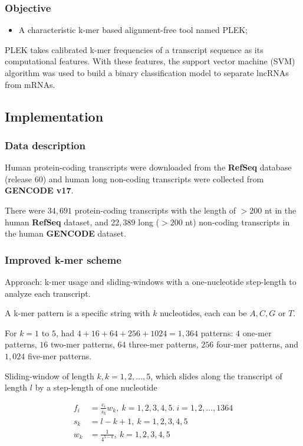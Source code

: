 \documentclass[hyperref={pdfpagelabels=false}]{beamer}
\begin{document}
\begin{frame}
\frametitle{Objective}
\begin{itemize}
 \item A characteristic k-mer based alignment-free tool named PLEK;\pause
\end{itemize}

\vspace{4px}

PLEK takes calibrated k-mer frequencies of a transcript sequence as its computational features. With these features, the support vector machine (SVM) algorithm was used to build a binary classification model to separate lncRNAs from mRNAs.

\end{frame}

\subsection{Implementation}
\begin{frame}
\frametitle{Data description}

Human protein-coding transcripts were downloaded from the \textbf{RefSeq} database (release 60) and human long non-coding transcripts were collected from \textbf{GENCODE v17}. \pause

There were $34,691$ protein-coding transcripts with the length of $>200$ nt in the human \textbf{RefSeq} dataset, and $22,389$ long ($>200$ nt) non-coding transcripts in the human \textbf{GENCODE} dataset.

\end{frame}


\begin{frame}
\frametitle{Improved k-mer scheme}
Approach:  k-mer usage and sliding-windows with a one-nucleotide step-length to analyze each transcript.\pause

A k-mer pattern is a specific string with $k$ nucleotides, each can be $A, C, G$ or $T$. \pause

For $k = 1$ to $5$, had $4 + 16 + 64 + 256 + 1024 = 1,364$ patterns: $4$ one-mer patterns, $16$ two-mer patterns, $64$ three-mer patterns, $256$ four-mer patterns, and $1,024$ five-mer patterns. \pause

Sliding-window of length $k, k = 1,2,...,5$, which slides along the transcript of length $l$ by a step-length of one nucleotide


\begin{align}
 f_i &= \frac{c_i}{s_k}w_k,~k=1,2,3,4,5.~ i=1,2,\dots,1364\\
 s_k &= l-k+1,~k=1,2,3,4,5\\
 w_k &= \frac{1}{4^{5-k}},~k=1,2,3,4,5
\end{align}

\end{frame}
\end{document}
